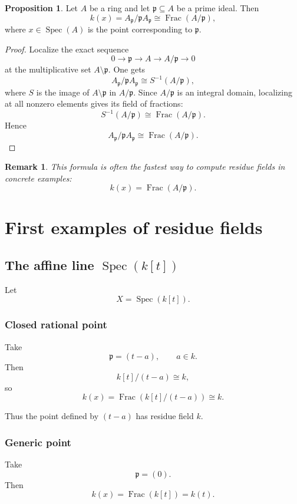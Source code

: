 \documentclass[12pt,a4paper]{article}
\theoremstyle{notespace}
\newtheorem{remark}{Remark}[section]
\newcommand{\Spec}{\operatorname{Spec}}
\newcommand{\Frac}{\operatorname{Frac}}
\newcommand{\p}{\mathfrak p}
\theoremstyle{definition}
\newtheorem{proposition}[definition]{Proposition}
\begin{document}
	\begin{proposition}
		Let \(A\) be a ring and let \(\p\subseteq A\) be a prime ideal. Then
		\[
		k(x)=A_{\p}/\p A_{\p}\cong \Frac(A/\p),
		\]
		where \(x\in \Spec(A)\) is the point corresponding to \(\p\).
	\end{proposition}
	
	\begin{proof}
		Localize the exact sequence
		\[
		0\longrightarrow \p \longrightarrow A \longrightarrow A/\p \longrightarrow 0
		\]
		at the multiplicative set \(A\setminus \p\). One gets
		\[
		A_{\p}/\p A_{\p}\cong S^{-1}(A/\p),
		\]
		where \(S\) is the image of \(A\setminus \p\) in \(A/\p\). Since \(A/\p\) is an integral domain, localizing at all nonzero elements gives its field of fractions:
		\[
		S^{-1}(A/\p)\cong \Frac(A/\p).
		\]
		Hence
		\[
		A_{\p}/\p A_{\p}\cong \Frac(A/\p).
		\]
	\end{proof}
	
	\begin{remark}
		This formula is often the fastest way to compute residue fields in concrete examples:
		\[
		\boxed{
			k(x)=\Frac(A/\p).
		}
		\]
	\end{remark}
	
	\section{First examples of residue fields}
	
	\subsection{The affine line \(\Spec(k[t])\)}
	
	Let
	\[
	X=\Spec(k[t]).
	\]
	
	\subsubsection{Closed rational point}
	
	Take
	\[
	\p=(t-a),\qquad a\in k.
	\]
	Then
	\[
	k[t]/(t-a)\cong k,
	\]
	so
	\[
	k(x)=\Frac(k[t]/(t-a))\cong k.
	\]
	
	Thus the point defined by \((t-a)\) has residue field \(k\).
	
	\subsubsection{Generic point}
	
	Take
	\[
	\p=(0).
	\]
	Then
	\[
	k(x)=\Frac(k[t])=k(t).
	\]
	
\end{document}
